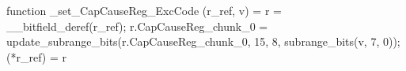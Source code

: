function _set_CapCauseReg_ExcCode (r_ref, v) = {
    r = __bitfield_deref(r_ref);
    r.CapCauseReg_chunk_0 = update_subrange_bits(r.CapCauseReg_chunk_0, 15, 8, subrange_bits(v, 7, 0));
    (*r_ref) = r
}
